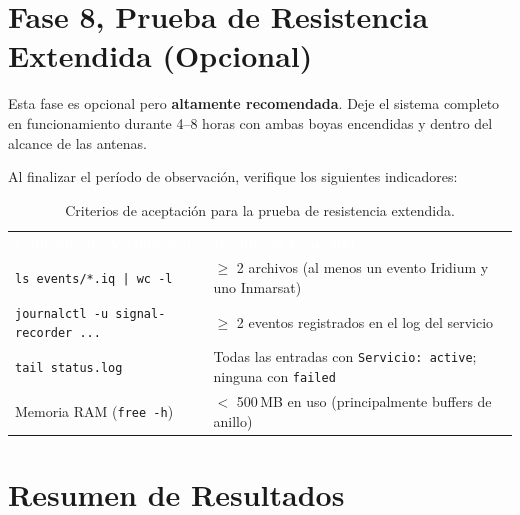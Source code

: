 \section{Fase 8, Prueba de Resistencia Extendida (Opcional)}

Esta fase es opcional pero \textbf{altamente recomendada}. Deje el sistema completo en funcionamiento durante 4--8 horas con ambas boyas encendidas y dentro del alcance de las antenas.

Al finalizar el período de observación, verifique los siguientes indicadores:

\begin{table}[h]
    \centering
    \renewcommand{\arraystretch}{1.8}
    \begin{tabularx}{\textwidth}{|l X|}
        \hline
        \rowcolor{deyposcolor}
        \textbf{\textcolor{white}{Comando de Verificación}} & \textbf{\textcolor{white}{Resultado Esperado}} \\
        \texttt{ls events/*.iq | wc -l} & $\geq$ 2 archivos (al menos un evento Iridium y uno Inmarsat) \\
        \rowcolor[gray]{0.95}
        \texttt{journalctl -u signal-recorder ...} & $\geq$ 2 eventos registrados en el log del servicio \\
        \texttt{tail status.log} & Todas las entradas con \texttt{Servicio: active}; ninguna con \texttt{failed} \\
        \rowcolor[gray]{0.95}
        Memoria RAM (\texttt{free -h}) & $<$ 500\,MB en uso (principalmente buffers de anillo) \\
        \hline
    \end{tabularx}
    \caption{Criterios de aceptación para la prueba de resistencia extendida.}
\end{table}

\newpage
\section{Resumen de Resultados}

